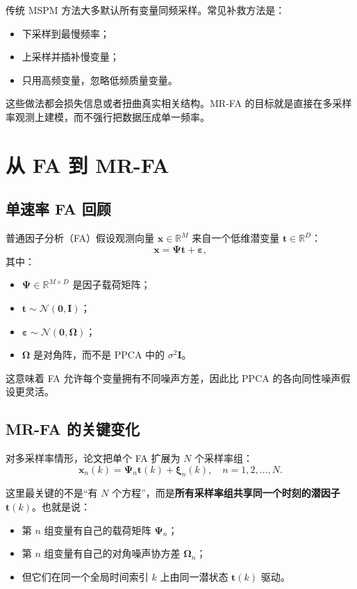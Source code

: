\documentclass[UTF8]{ctexart}
\begin{document}
传统 MSPM 方法大多默认所有变量同频采样。常见补救方法是：
\begin{itemize}
    \item 下采样到最慢频率；
    \item 上采样并插补慢变量；
    \item 只用高频变量，忽略低频质量变量。
\end{itemize}

这些做法都会损失信息或者扭曲真实相关结构。MR-FA 的目标就是直接在多采样率观测上建模，而不强行把数据压成单一频率。

\section{从 FA 到 MR-FA}

\subsection{单速率 FA 回顾}

普通因子分析（FA）假设观测向量 $\bm{x} \in \mathbb{R}^{M}$ 来自一个低维潜变量 $\bm{t} \in \mathbb{R}^{D}$：
\begin{equation}
    \bm{x} = \bm{\Psi}\bm{t} + \bm{\varepsilon},
\end{equation}
其中：
\begin{itemize}
    \item $\bm{\Psi} \in \mathbb{R}^{M \times D}$ 是因子载荷矩阵；
    \item $\bm{t} \sim \mathcal{N}(\bm{0}, \bm{I})$；
    \item $\bm{\varepsilon} \sim \mathcal{N}(\bm{0}, \bm{\Omega})$；
    \item $\bm{\Omega}$ 是对角阵，而不是 PPCA 中的 $\sigma^2 \bm{I}$。
\end{itemize}

这意味着 FA 允许每个变量拥有不同噪声方差，因此比 PPCA 的各向同性噪声假设更灵活。

\subsection{MR-FA 的关键变化}

对多采样率情形，论文把单个 FA 扩展为 $N$ 个采样率组：
\begin{equation}
    \bm{x}_n(k) = \bm{\Psi}_n \bm{t}(k) + \bm{\xi}_n(k), \quad n = 1,2,\dots,N.
\end{equation}

这里最关键的不是“有 $N$ 个方程”，而是\textbf{所有采样率组共享同一个时刻的潜因子 $\bm{t}(k)$}。也就是说：
\begin{itemize}
    \item 第 $n$ 组变量有自己的载荷矩阵 $\bm{\Psi}_n$；
    \item 第 $n$ 组变量有自己的对角噪声协方差 $\bm{\Omega}_n$；
    \item 但它们在同一个全局时间索引 $k$ 上由同一潜状态 $\bm{t}(k)$ 驱动。
\end{itemize}
\end{document}
